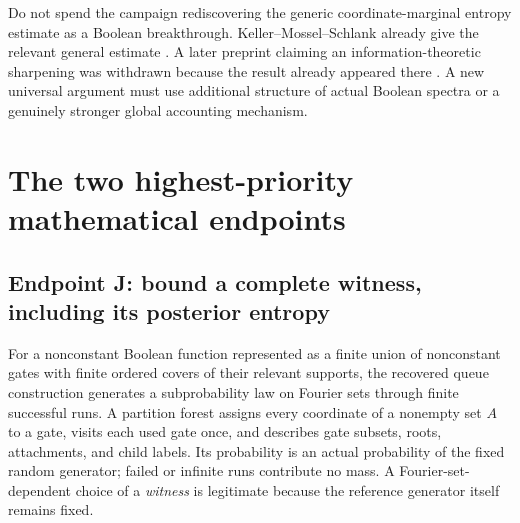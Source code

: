 \documentclass[11pt]{article}
\begin{document}
Do not spend the campaign rediscovering the generic coordinate-marginal entropy estimate as a Boolean breakthrough. Keller--Mossel--Schlank already give the relevant general estimate \cite{KMS}. A later preprint claiming an information-theoretic sharpening was withdrawn because the result already appeared there \cite{Withdrawn}. A new universal argument must use additional structure of actual Boolean spectra or a genuinely stronger global accounting mechanism.

\section{The two highest-priority mathematical endpoints}

\subsection{Endpoint J: bound a complete witness, including its posterior entropy}

For a nonconstant Boolean function represented as a finite union of nonconstant gates with finite ordered covers of their relevant supports, the recovered queue construction generates a subprobability law on Fourier sets through finite successful runs. A partition forest assigns every coordinate of a nonempty set $A$ to a gate, visits each used gate once, and describes gate subsets, roots, attachments, and child labels. Its probability is an actual probability of the fixed random generator; failed or infinite runs contribute no mass. A Fourier-set-dependent choice of a \emph{witness} is legitimate because the reference generator itself remains fixed.
\end{document}
